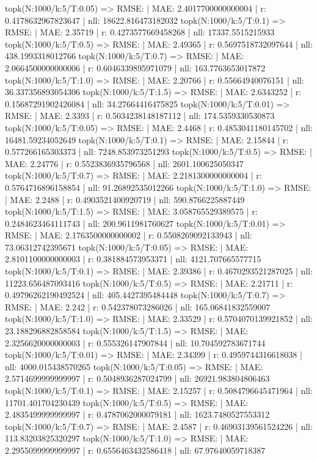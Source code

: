 topk(N:1000/k:5/T:0.05) => RMSE: | MAE: 2.4017700000000004 | r: 0.4178632967823647 | nll: 18622.816473182032
topk(N:1000/k:5/T:0.1) => RMSE: | MAE: 2.35719 | r: 0.4273577669458268 | nll: 17337.5515215933
topk(N:1000/k:5/T:0.5) => RMSE: | MAE: 2.49365 | r: 0.5697518732097644 | nll: 438.1993318012766
topk(N:1000/k:5/T:0.7) => RMSE: | MAE: 2.0664500000000006 | r: 0.6046339895971079 | nll: 163.7763653017872
topk(N:1000/k:5/T:1.0) => RMSE: | MAE: 2.20766 | r: 0.55664940076151 | nll: 36.337356893054306
topk(N:1000/k:5/T:1.5) => RMSE: | MAE: 2.6343252 | r: 0.15687291902426084 | nll: 34.27664416475825
topk(N:1000/k:5/T:0.01) => RMSE: | MAE: 2.3393 | r: 0.5034238148187112 | nll: 174.5359330530873
topk(N:1000/k:5/T:0.05) => RMSE: | MAE: 2.4468 | r: 0.4853041180145702 | nll: 16481.59234052649
topk(N:1000/k:5/T:0.1) => RMSE: | MAE: 2.15844 | r: 0.577266165303373 | nll: 7248.853973251293
topk(N:1000/k:5/T:0.5) => RMSE: | MAE: 2.24776 | r: 0.5523836935796568 | nll: 2601.100625050347
topk(N:1000/k:5/T:0.7) => RMSE: | MAE: 2.2181300000000004 | r: 0.5764716896158854 | nll: 91.26892535012266
topk(N:1000/k:5/T:1.0) => RMSE: | MAE: 2.2488 | r: 0.4903521400920719 | nll: 590.8766225887449
topk(N:1000/k:5/T:1.5) => RMSE: | MAE: 3.058765529389575 | r: 0.2484623464111743 | nll: 200.9611981760627
topk(N:1000/k:5/T:0.01) => RMSE: | MAE: 2.1763500000000002 | r: 0.5508269092133943 | nll: 73.06312742395671
topk(N:1000/k:5/T:0.05) => RMSE: | MAE: 2.8101100000000003 | r: 0.381884573953371 | nll: 4121.707665577715
topk(N:1000/k:5/T:0.1) => RMSE: | MAE: 2.39386 | r: 0.4670293521287025 | nll: 11223.656487093416
topk(N:1000/k:5/T:0.5) => RMSE: | MAE: 2.21711 | r: 0.49796262190492524 | nll: 405.4427395484448
topk(N:1000/k:5/T:0.7) => RMSE: | MAE: 2.242 | r: 0.542378073286026 | nll: 165.06841832559007
topk(N:1000/k:5/T:1.0) => RMSE: | MAE: 2.33529 | r: 0.5704070139921852 | nll: 23.188296882858584
topk(N:1000/k:5/T:1.5) => RMSE: | MAE: 2.3256620000000003 | r: 0.555326147907844 | nll: 10.704592783671744
topk(N:1000/k:5/T:0.01) => RMSE: | MAE: 2.34399 | r: 0.4959744316618038 | nll: 4000.015438570265
topk(N:1000/k:5/T:0.05) => RMSE: | MAE: 2.5714699999999997 | r: 0.5048936287024799 | nll: 26921.983804806463
topk(N:1000/k:5/T:0.1) => RMSE: | MAE: 2.15257 | r: 0.5084796645471964 | nll: 11701.401704230439
topk(N:1000/k:5/T:0.5) => RMSE: | MAE: 2.4835499999999997 | r: 0.4787062000079181 | nll: 1623.7480527553312
topk(N:1000/k:5/T:0.7) => RMSE: | MAE: 2.4587 | r: 0.46903139561524226 | nll: 113.83203825320297
topk(N:1000/k:5/T:1.0) => RMSE: | MAE: 2.2955099999999997 | r: 0.6556463432586418 | nll: 67.97640059718387
